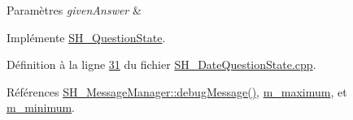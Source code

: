 \begin{DoxyParams}{Paramètres}
{\em given\-Answer} & \\
\hline
\end{DoxyParams}


Implémente \hyperlink{classSH__QuestionState_a8780740599e2e183560a670ff9874708}{S\-H\-\_\-\-Question\-State}.



Définition à la ligne \hyperlink{SH__DateQuestionState_8cpp_source_l00031}{31} du fichier \hyperlink{SH__DateQuestionState_8cpp_source}{S\-H\-\_\-\-Date\-Question\-State.\-cpp}.



Références \hyperlink{classSH__MessageManager_a379f2aa0a590a5add34dbe91f98b2ff7}{S\-H\-\_\-\-Message\-Manager\-::debug\-Message()}, \hyperlink{classSH__DateQuestionState_a9cb25c158f1622cf65b868c2bbab7e30}{m\-\_\-maximum}, et \hyperlink{classSH__DateQuestionState_a9b4c46cf566ae037d816e1d6b66c777b}{m\-\_\-minimum}.


